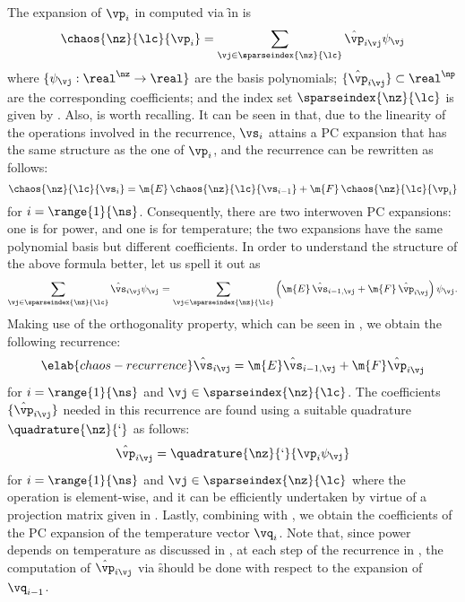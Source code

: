 The expansion of $\vp_i$ in  computed via \f in
 is
\[
  \chaos{\nz}{\lc}{\vp_i} = \sum_{\vj \in \sparseindex{\nz}{\lc}} \hat{\vp}_{i \vj} \psi_{\vj}
\]
where $\{ \psi_{\vj}: \real^\nz \to \real \}$ are the basis polynomials; $\{
\hat{\vp}_{i \vj} \} \subset \real^\np$ are the corresponding coefficients; and
the index set $\sparseindex{\nz}{\lc}$ is given by
. Also, 
is worth recalling. It can be seen in  that, due
to the linearity of the operations involved in the recurrence, $\vs_i$ attains a
\ac{PC} expansion that has the same structure as the one of $\vp_i$, and the
recurrence can be rewritten as follows:
\[
  \chaos{\nz}{\lc}{\vs_i} = \m{E} \, \chaos{\nz}{\lc}{\vs_{i - 1}} + \m{F} \, \chaos{\nz}{\lc}{\vp_i}
\]
for $i = \range{1}{\ns}$. Consequently, there are two interwoven \ac{PC}
expansions: one is for power, and one is for temperature; the two expansions
have the same polynomial basis but different coefficients. In order to
understand the structure of the above formula better, let us spell it out as
\[
  \sum_{\vj \in \sparseindex{\nz}{\lc}} \hat{\vs}_{i \vj} \psi_{\vj} =
  \sum_{\vj \in \sparseindex{\nz}{\lc}} \left(\m{E} \, \hat{\vs}_{i - 1, \vj} + \m{F} \, \hat{\vp}_{i \vj}\right) \psi_{\vj}.
\]
Making use of the orthogonality property, which can be seen in
, we obtain the following recurrence:
\begin{equation} \elab{chaos-recurrence}
  \hat{\vs}_{i \vj} = \m{E} \hat{\vs}_{i - 1, \vj} + \m{F} \hat{\vp}_{i \vj}
\end{equation}
for $i = \range{1}{\ns}$ and $\vj \in \sparseindex{\nz}{\lc}$. The coefficients
$\{ \hat{\vp}_{i \vj} \}$ needed in this recurrence are found using a suitable
quadrature $\quadrature{\nz}{\lq}$ as follows:
\[
  \hat{\vp}_{i \vj} = \quadrature{\nz}{\lq}{\vp_i \psi_{\vj}}
\]
for $i = \range{1}{\ns}$ and $\vj \in \sparseindex{\nz}{\lc}$ where the
operation is element-wise, and it can be efficiently undertaken by virtue of a
projection matrix given in . Lastly, combining
 with , we obtain the
coefficients of the \ac{PC} expansion of the temperature vector $\vq_i$. Note
that, since power depends on temperature as discussed in , at
each step of the recurrence in , the computation of
$\hat{\vp}_{i \vj}$ via \f should be done with respect to the expansion of
$\vq_{i - 1}$.

